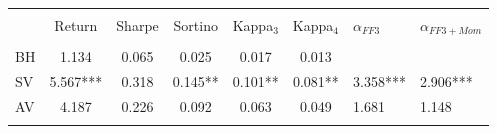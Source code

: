 
\begin{tabular}{@{\extracolsep{5pt}} lcccccHH} 
\\[-1.8ex]\hline 
\hline \\[-1.8ex] 
& Return & Sharpe & Sortino & Kappa$_{3}$ & Kappa$_{4}$ & $\alpha_{FF3}$ & $\alpha_{FF3+Mom}$ \\ 
\hline \\[-1.8ex] 
BH &1.134 & 0.065 & 0.025 & 0.017 & 0.013 &  &  \\ 
SV & 5.567*** & 0.318 & 0.145** & 0.101** & 0.081** & 3.358*** & 2.906*** \\ 
AV & 4.187 & 0.226 & 0.092 & 0.063 & 0.049 & 1.681 & 1.148 \\ 
\hline \\[-1.8ex] 
\end{tabular} 
